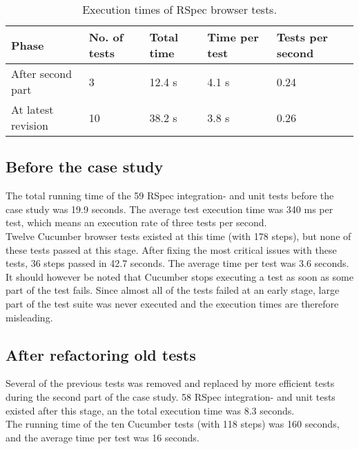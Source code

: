 \begin{table}[t]
    \centering
    \begin{tabular}{l l l l l}
        Phase & No. of tests & Total time & Time per test & Tests per second \\
        \hline
        After second part  & 3  & 12.4 s & 4.1 s & 0.24\\
        At latest revision & 10 & 38.2 s & 3.8 s & 0.26\\
    \end{tabular}
    \caption{ Execution times of RSpec browser tests. }
    \label{tab:rspec_browser_times}
\end{table}


\subsection{Before the case study}

The total running time of the 59 RSpec integration- and unit tests
before the case study was 19.9 seconds. The average test execution time
was 340 ms per test, which means an execution rate of three tests per
second.\\

Twelve Cucumber browser tests existed at this time (with 178 steps), but
none of these tests passed at this stage. After fixing the most critical
issues with these tests, 36 steps passed in 42.7 seconds. The average
time per test was 3.6 seconds. It should however be noted that Cucumber
stops executing a test as soon as some part of the test fails. Since
almost all of the tests failed at an early stage, large part of the test
suite was never executed and the execution times are therefore
misleading.\\


\subsection{After refactoring old tests}

Several of the previous tests was removed and replaced by more efficient
tests during the second part of the case study. 58 RSpec integration-
and unit tests existed after this stage, an the total execution time was
8.3 seconds.\\

The running time of the ten Cucumber tests (with 118 steps) was 160
seconds, and the average time per test was 16 seconds.\\


